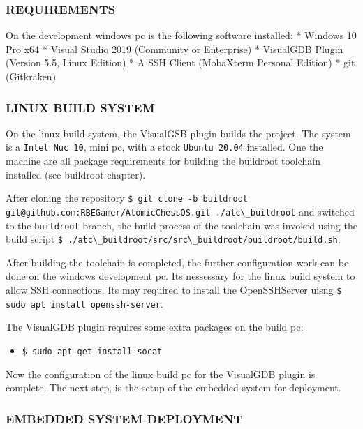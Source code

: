\hypertarget{requirements-1}{%
\subsubsection{REQUIREMENTS}\label{requirements-1}}

On the development windows pc is the following software installed: *
Windows 10 Pro x64 * Visual Studio 2019 (Community or Enterprise) *
VisualGDB Plugin (Version 5.5, Linux Edition) * A SSH Client (MobaXterm
Personal Edition) * git (Gitkraken)

\hypertarget{linux-build-system}{%
\subsubsection{LINUX BUILD SYSTEM}\label{linux-build-system}}

On the linux build system, the VisualGSB plugin builds the project. The
system is a \passthrough{\lstinline!Intel Nuc 10!}, mini pc, with a
stock \passthrough{\lstinline!Ubuntu 20.04!} installed. One the machine
are all package requirements for building the buildroot toolchain
installed (see buildroot chapter).

After cloning the repository
\passthrough{\lstinline!$ git clone -b buildroot git@github.com:RBEGamer/AtomicChessOS.git ./atc\_buildroot!}
and switched to the \passthrough{\lstinline!buildroot!} branch, the
build process of the toolchain was invoked using the build script
\passthrough{\lstinline!$ ./atc\_buildroot/src/src\_buildroot/buildroot/build.sh!}.

After building the toolchain is completed, the further configuration
work can be done on the windows development pc. Its nessessary for the
linux build system to allow SSH connections. Its may required to install
the OpenSSHServer uisng
\passthrough{\lstinline!$ sudo apt install openssh-server!}.

The VisualGDB plugin requires some extra packages on the build pc:

\begin{itemize}
\tightlist
\item
  \passthrough{\lstinline!$ sudo apt-get install socat!}
\end{itemize}

Now the configuration of the linux build pc for the VisualGDB plugin is
complete. The next step, is the setup of the embedded system for
deployment.

\hypertarget{embedded-system-deployment}{%
\subsubsection{EMBEDDED SYSTEM
DEPLOYMENT}\label{embedded-system-deployment}}

